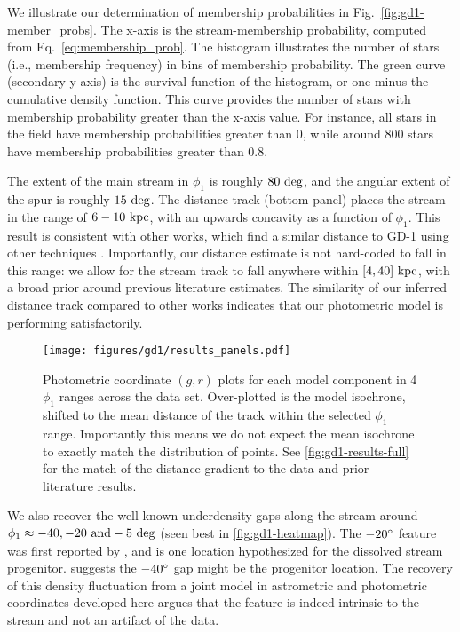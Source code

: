 \documentclass[twocolumn, linenumbers]{aastex631}
\newcommand{\stream}[1]{#1}
\begin{document}
        We illustrate our determination of membership probabilities in Fig.~\ref{fig:gd1-member_probs}. The x-axis is the stream-membership probability, computed from Eq.~\ref{eq:membership_prob}. The histogram illustrates the number of stars (i.e., membership frequency) in bins of membership probability. The green curve (secondary y-axis) is the survival function of the histogram, or one minus the cumulative density function. This curve provides the number of stars with membership probability greater than the x-axis value. For instance, all stars in the field have membership probabilities greater than 0, while around 800 stars have membership probabilities greater than 0.8.
        
        The extent of the main stream in $\phi_1$ is roughly $80~\rm{deg}$, and
        the angular extent of the spur is roughly $15~\rm{deg}$. The distance
        track (bottom panel) places the stream in the range of $6-10~\rm{kpc}$,
        with an upwards concavity as a function of $\phi_1$. This result is
        consistent with other works, which find a similar distance to
        \stream{GD-1} using other techniques \citep{deBoer+2020, Ibata+2021}.
        Importantly, our distance estimate is not hard-coded to fall in this
        range: we allow for the stream track to fall anywhere within
        $[4,40]~\rm{kpc}$, with a broad prior around previous literature
        estimates. The similarity of our inferred distance track compared to
        other works indicates that our photometric model is performing
        satisfactorily.

        \begin{figure*}[t]
            \centering
            \texttt{[image: figures/gd1/results\_panels.pdf]}
            \caption{%
                Photometric coordinate $(g, r)$ plots for each model component
                in 4 $\phi_1$ ranges across the data set. Over-plotted is the
                model isochrone, shifted to the mean distance of the track
                within the selected $\phi_1$ range. Importantly this means we do
                not expect the mean isochrone to exactly match the distribution
                of points. See \autoref{fig:gd1-results-full} for the match of
                the distance gradient to the data and prior literature results.
            }
            \label{fig:gd1-results-panels}
        \end{figure*}

        We also recover the well-known underdensity gaps along the stream around
        $\phi_1 \approx -40, -20 \ \rm{and } -5~\rm{deg}$ (seen best in
        \autoref{fig:gd1-heatmap}). The $-20\degree$ feature was first reported
        by \citet{CarlbergGrillmair2013}, and is one location hypothesized for
        the dissolved stream progenitor. \citet{WebbBovy2019} suggests the
        $-40\degree$ gap might be  the progenitor location.  The recovery of
        this density fluctuation from a joint model in astrometric and
        photometric coordinates developed here argues that the feature is indeed
        intrinsic to the stream and not an artifact of the data.
\end{document}
